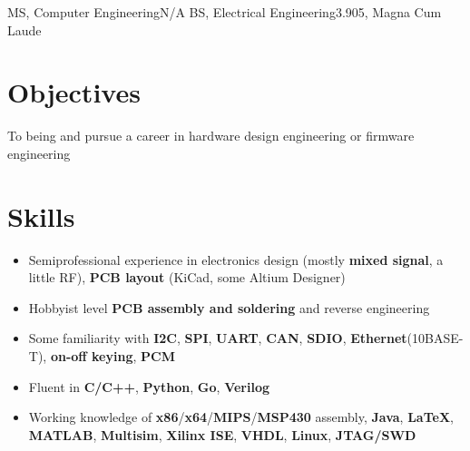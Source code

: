 \documentclass{my_resume}
\begin{document}

    {MS, Computer Engineering}{N/A}
	{BS, Electrical Engineering}{3.905, Magna Cum Laude}

\section{Objectives}
To being and pursue a career in hardware design engineering or firmware engineering

\section{Skills}
\begin{itemize}[noitemsep]
    \item Semiprofessional experience in electronics design (mostly \textbf{mixed signal}, a little RF), \textbf{PCB layout} (KiCad, some Altium Designer)
    \item Hobbyist level \textbf{PCB assembly and soldering} and reverse engineering
    \item Some familiarity with \textbf{I2C}, \textbf{SPI}, \textbf{UART}, \textbf{CAN}, \textbf{SDIO}, \textbf{Ethernet}(10BASE-T), \textbf{on-off keying}, \textbf{PCM}
    \item Fluent in \textbf{C/C++}, \textbf{Python}, \textbf{Go}, \textbf{Verilog}
    \item Working knowledge of \textbf{x86}/\textbf{x64}/\textbf{MIPS}/\textbf{MSP430} assembly, \textbf{Java}, \textbf{LaTeX}, \textbf{MATLAB}, \textbf{Multisim}, \textbf{Xilinx ISE}, \textbf{VHDL}, \textbf{Linux}, \textbf{JTAG/SWD}
\end{itemize}
\end{document}

